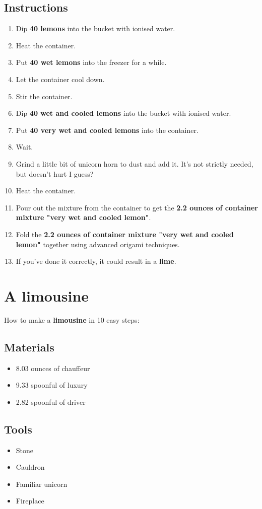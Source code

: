 \documentclass{article}
\begin{document}
\subsection{Instructions}\begin{enumerate}
\item 
Dip \textbf{40 lemons} into the bucket with ionised water.
\item 
Heat the container.
\item 
Put \textbf{40 wet lemons} into the freezer for a while.
\item 
Let the container cool down.
\item 
Stir the container.
\item 
Dip \textbf{40 wet and cooled lemons} into the bucket with ionised water.
\item 
Put \textbf{40 very wet and cooled lemons} into the container.
\item 
Wait.
\item 
Grind a little bit of unicorn horn to dust and add it. It's not strictly needed, but doesn't hurt I guess?
\item 
Heat the container.
\item 
Pour out the mixture from the container to get the \textbf{2.2 ounces of container mixture "very wet and cooled lemon"}.
\item 
Fold the \textbf{2.2 ounces of container mixture "very wet and cooled lemon"} together using advanced origami techniques.
\item 
If you've done it correctly, it could result in a \textbf{lime}.
\end{enumerate}
\newpage
\section{A limousine}How to make a \textbf{limousine} in 10 easy steps:

\subsection{Materials}\begin{itemize}
\item 
8.03 ounces of chauffeur
\item 
9.33 spoonful of luxury
\item 
2.82 spoonful of driver
\end{itemize}
\subsection{Tools}\begin{itemize}
\item 
Stone
\item 
Cauldron
\item 
Familiar unicorn
\item 
Fireplace
\end{itemize}
\end{document}
